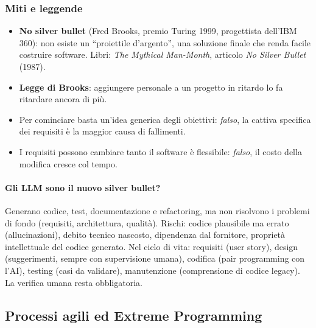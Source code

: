 \documentclass[a4paper,12pt]{article}
\begin{document}
\subsubsection{Miti e leggende}
\begin{itemize}
  \item \textbf{No silver bullet} (Fred Brooks, premio Turing 1999, progettista dell'IBM
        360): non esiste un ``proiettile d'argento'', una soluzione finale che renda facile
        costruire software. Libri: \emph{The Mythical Man-Month}, articolo \emph{No Silver
        Bullet} (1987).
  \item \textbf{Legge di Brooks}: aggiungere personale a un progetto in ritardo lo fa
        ritardare ancora di più.
  \item Per cominciare basta un'idea generica degli obiettivi: \emph{falso}, la cattiva
        specifica dei requisiti è la maggior causa di fallimenti.
  \item I requisiti possono cambiare tanto il software è flessibile: \emph{falso}, il
        costo della modifica cresce col tempo.
\end{itemize}

\paragraph{Gli LLM sono il nuovo silver bullet?} Generano codice, test, documentazione e
refactoring, ma non risolvono i problemi di fondo (requisiti, architettura, qualità).
Rischi: codice plausibile ma errato (allucinazioni), debito tecnico nascosto, dipendenza
dal fornitore, proprietà intellettuale del codice generato. Nel ciclo di vita: requisiti
(user story), design (suggerimenti, sempre con supervisione umana), codifica (pair
programming con l'AI), testing (casi da validare), manutenzione (comprensione di codice
legacy). La verifica umana resta obbligatoria.

\subsection{Processi agili ed Extreme Programming}
\end{document}
